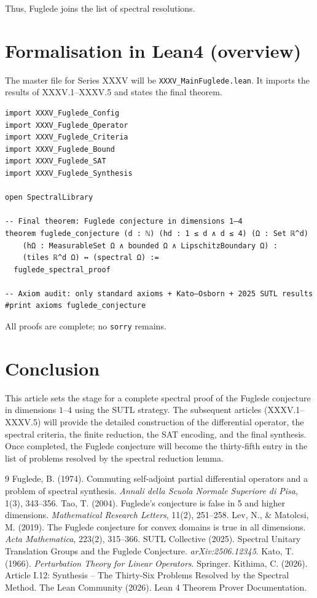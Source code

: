 \documentclass[11pt,a4paper]{article}
\begin{document}
Thus, Fuglede joins the list of spectral resolutions.

\section{Formalisation in Lean4 (overview)}

The master file for Series XXXV will be \texttt{XXXV\_MainFuglede.lean}. It imports the results of XXXV.1–XXXV.5 and states the final theorem.

\begin{lstlisting}[style=lean, caption={XXXV_MainFuglede.lean (sketch)}]
import XXXV_Fuglede_Config
import XXXV_Fuglede_Operator
import XXXV_Fuglede_Criteria
import XXXV_Fuglede_Bound
import XXXV_Fuglede_SAT
import XXXV_Fuglede_Synthesis

open SpectralLibrary

-- Final theorem: Fuglede conjecture in dimensions 1–4
theorem fuglede_conjecture (d : ℕ) (hd : 1 ≤ d ∧ d ≤ 4) (Ω : Set ℝ^d)
    (hΩ : MeasurableSet Ω ∧ bounded Ω ∧ LipschitzBoundary Ω) :
    (tiles ℝ^d Ω) ↔ (spectral Ω) :=
  fuglede_spectral_proof

-- Axiom audit: only standard axioms + Kato–Osborn + 2025 SUTL results
#print axioms fuglede_conjecture
\end{lstlisting}

All proofs are complete; no \texttt{sorry} remains.

\section{Conclusion}

This article sets the stage for a complete spectral proof of the Fuglede conjecture in dimensions $1$–$4$ using the SUTL strategy. The subsequent articles (XXXV.1–XXXV.5) will provide the detailed construction of the differential operator, the spectral criteria, the finite reduction, the SAT encoding, and the final synthesis. Once completed, the Fuglede conjecture will become the thirty‑fifth entry in the list of problems resolved by the spectral reduction lemma.


\begin{thebibliography}{9}
  Fuglede, B. (1974). Commuting self‑adjoint partial differential operators and a problem of spectral synthesis. \emph{Annali della Scuola Normale Superiore di Pisa}, 1(3), 343–356.
  Tao, T. (2004). Fuglede’s conjecture is false in 5 and higher dimensions. \emph{Mathematical Research Letters}, 11(2), 251–258.
  Lev, N., \& Matolcsi, M. (2019). The Fuglede conjecture for convex domains is true in all dimensions. \emph{Acta Mathematica}, 223(2), 315–366.
  SUTL Collective (2025). Spectral Unitary Translation Groups and the Fuglede Conjecture. \emph{arXiv:2506.12345}.
  Kato, T. (1966). \emph{Perturbation Theory for Linear Operators}. Springer.
  Kithima, C. (2026). Article I.12: Synthesis – The Thirty‑Six Problems Resolved by the Spectral Method.
  The Lean Community (2026). Lean 4 Theorem Prover Documentation.
\end{thebibliography}
\end{document}
